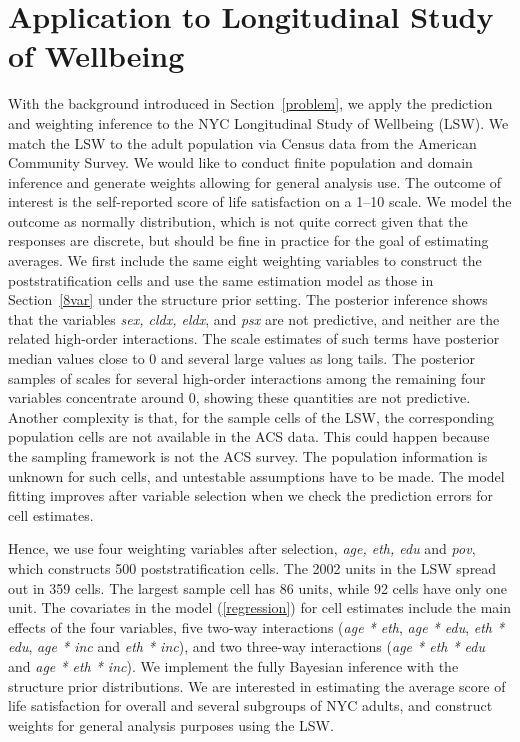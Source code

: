 \documentclass[11pt]{article}
\begin{document}
\section{Application to Longitudinal Study of Wellbeing}
\label{application}

With the background introduced in Section~\ref{problem}, we apply the prediction and weighting inference to the NYC Longitudinal Study of Wellbeing (LSW). We match the LSW to the adult population via Census data from the American Community Survey. We would like to conduct finite population and domain inference and generate weights allowing for general analysis use. The outcome of interest is the self-reported score of life satisfaction on a 1--10 scale.  We model the outcome  as normally distribution, which is not quite correct given that the responses are discrete, but should be fine in practice for the goal of estimating averages. We first include the same eight weighting variables to construct the poststratification cells and use the same estimation model as those in Section~\ref{8var} under the structure prior setting. The posterior inference shows that the variables {\em sex, cldx, eldx}, and {\em psx} are not predictive, and neither are the related high-order interactions. The scale estimates of such terms have posterior median values close to 0 and several large values as long tails. The posterior samples of scales for several high-order interactions among the remaining four variables concentrate around 0, showing these quantities are not predictive. Another complexity is that, for the sample cells of the LSW, the corresponding population cells are not available in the ACS data. This could happen because the sampling framework is not the ACS survey. The population information is unknown for such cells, and untestable assumptions have to be made. The model fitting improves after variable selection when we check the prediction errors for cell estimates.

Hence, we use four weighting variables after selection, {\em age, eth, edu} and {\em pov}, which constructs 500 poststratification cells. The 2002 units in the LSW spread out in 359 cells. The largest sample cell has 86 units, while 92 cells have only one unit. The covariates in the model (\ref{regression}) for cell estimates include the main effects of the four variables, five two-way interactions ({\em age * eth}, {\em age * edu}, {\em eth * edu}, {\em age * inc} and {\em eth * inc}), and two three-way interactions ({\em age * eth * edu} and {\em age * eth * inc}). We implement the fully Bayesian inference with the structure prior distributions. We are interested in estimating the average score of life satisfaction for overall and several subgroups of NYC adults, and construct weights for general analysis purposes using the LSW. 
\end{document}
